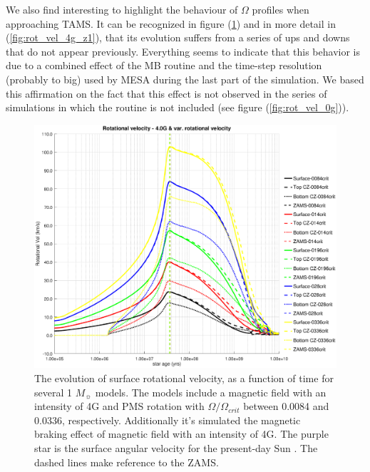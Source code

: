 \documentclass[fleqn,usenatbib]{mnras}
\begin{document}
We also find interesting to highlight the behaviour of $\Omega$ profiles when approaching TAMS. It can be recognized in figure (\ref{fig:rot_vel_4g}) and in more detail in (\ref{fig:rot_vel_4g_z1}), that its evolution suffers from a series of ups and downs that do not appear previously. Everything seems to indicate that this behavior is due to a combined effect of the MB routine and the time-step resolution (probably to big) used by MESA during the last part of the simulation. We based this affirmation on the fact that this effect is not observed in the series of simulations in which the routine is not included (see figure (\ref{fig:rot_vel_0g})).\par

\begin{figure}
	\includegraphics[trim = 30mm 15mm 20mm 15mm, clip,width=\columnwidth]{figures/rot_vel_var_vel_4_0g.eps}
    \caption{The evolution of surface rotational velocity, as a function of time for several 1 $M_{\sun}$ models. The models include a magnetic field with an intensity of 4G and PMS rotation with $\Omega / \Omega_{crit}$ between 0.0084 and 0.0336, respectively. Additionally it's simulated the magnetic braking effect of magnetic field with an intensity of 4G. The purple star is the surface angular velocity for the present-day Sun \citep{Gill2012}. The dashed lines make reference to the ZAMS.}
    \label{fig:rot_vel_4g}
\end{figure}
\end{document}
